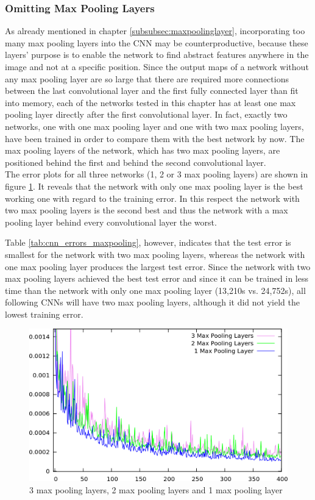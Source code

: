 \documentclass[11pt, a4paper]{article}
\begin{document}
\subsubsection{Omitting Max Pooling Layers}
\label{subsubsec:omittingmpl}

As already mentioned in chapter \ref{subsubsec:maxpoolinglayer}, incorporating too many max pooling layers into the \ac{CNN} may be counterproductive, because these layers' purpose is to enable the network to find abstract features anywhere in the image and not at a specific position. Since the output maps of a network without any max pooling layer are so large that there are required more connections between the last convolutional layer and the first fully connected layer than fit into memory, each of the networks tested in this chapter has at least one max pooling layer directly after the first convolutional layer. In fact, exactly two networks, one with one max pooling layer and one with two max pooling layers, have been trained in order to compare them with the best network by now. The max pooling layers of the network, which has two max pooling layers, are positioned behind the first and behind the second convolutional layer.\\
The error plots for all three networks (1, 2 or 3 max pooling layers) are shown in figure \ref{fig:cnn_maxpooling}. It reveals that the network with only one max pooling layer is the best working one with regard to the training error. In this respect the network with two max pooling layers is the second best and thus the network with a max pooling layer behind every convolutional layer the worst.

Table \ref{tab:cnn_errors_maxpooling}, however, indicates that the test error is smallest for the network with two max pooling layers, whereas the network with one max pooling layer produces the largest test error. Since the network with two max pooling layers achieved the best test error and since it can be trained in less time than the network with only one max pooling layer (13,210s vs. 24,752s), all following \acp{CNN} will have two max pooling layers, although it did not yield the lowest training error.

\begin{figure}[h!]
	\centering
	\includegraphics[width=\textwidth]{results/cnn_maxpooling.png}
	\caption{3 max pooling layers, 2 max pooling layers and 1 max pooling layer}
	\label{fig:cnn_maxpooling}
\end{figure}
\end{document}
